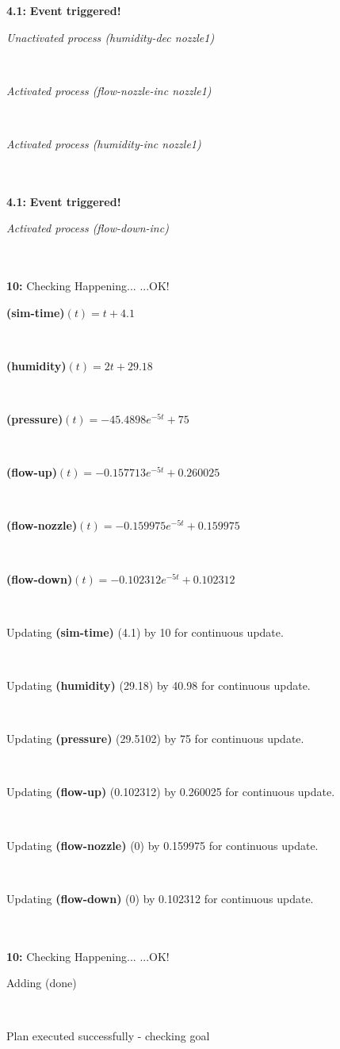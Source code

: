 \documentclass[a4paper,12pt]{article}
\newcommand{\atime}[1]{{\bf #1:}}
\newcommand{\action}[1]{{\sf #1}}
\newcommand{\exprn}[1]{{\sf #1}}
\newcommand{\fexprn}[1]{{\small {\bf #1}}}
\newcommand{\checkhappening}{Checking Happening... }
\newcommand{\eventtriggered}{{\bf Event triggered!}}
\newcommand{\listrow}[1]{\begin{minipage}[t]{11.5cm} #1 \end{minipage}}
\newcommand{\happeningOK}{...OK!}
\newcommand{\aprocessactivated}[1]{\listrow{{\it Activated process #1} }}
\newcommand{\aprocessunactivated}[1]{\listrow{{\it Unactivated process #1} }}
\newcommand{\assignmentcts}[3]{\listrow{Updating \fexprn{#1} (#2) by #3 for continuous update.}}
\newcommand{\function}[2]{\listrow{\fexprn{#1}$(t) = #2$}}
\newcommand{\adding}[1]{\listrow{Adding \exprn{#1} }}
\begin{document}
\begin{tabbing}
 \atime{4.1} \> \eventtriggered \\
\> \aprocessunactivated{\action{(humidity-dec nozzle1)}}\\
\> \aprocessactivated{\action{(flow-nozzle-inc nozzle1)}}\\
\> \aprocessactivated{\action{(humidity-inc nozzle1)}}\\
\\
 \atime{4.1} \> \eventtriggered \\
\> \aprocessactivated{\action{(flow-down-inc)}}\\
\\
\atime{10} \> \checkhappening\happeningOK\\
 \> \function{(sim-time)}{t + 4.1}\\
 \> \function{(humidity)}{2t + 29.18}\\
 \> \function{(pressure)}{-45.4898e^{ - 5t} + 75}\\
 \> \function{(flow-up)}{-0.157713e^{ - 5t} + 0.260025}\\
 \> \function{(flow-nozzle)}{-0.159975e^{ - 5t} + 0.159975}\\
 \> \function{(flow-down)}{-0.102312e^{ - 5t} + 0.102312}\\
 \> \assignmentcts{(sim-time)}{4.1}{10}\\
 \> \assignmentcts{(humidity)}{29.18}{40.98}\\
 \> \assignmentcts{(pressure)}{29.5102}{75}\\
 \> \assignmentcts{(flow-up)}{0.102312}{0.260025}\\
 \> \assignmentcts{(flow-nozzle)}{0}{0.159975}\\
 \> \assignmentcts{(flow-down)}{0}{0.102312}\\
\\
\atime{10} \> \checkhappening\happeningOK\\
 \> \adding{(done)}\\
\end{tabbing}
Plan executed successfully - checking goal\\
\\
\end{document}
